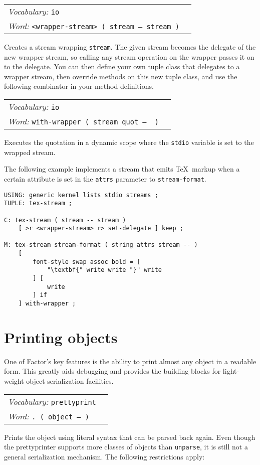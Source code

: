 \documentclass{book}
\newcommand{\vocabulary}[1]{\emph{Vocabulary:} \texttt{#1}&\\}
\newcommand{\ordinaryword}[2]{\index{\texttt{#1}}\emph{Word:} \texttt{#2}&\\}
\newcommand{\wordtable}[1]{


\begin{tabularx}{12cm}{lX}
\hline
#1
\hline
\end{tabularx}

}
\begin{document}
\wordtable{
\vocabulary{io}
\ordinaryword{<wrapper-stream>}{<wrapper-stream>~( stream -- stream~)}
}
Creates a stream wrapping \texttt{stream}. The given stream becomes the delegate of the new wrapper stream, so calling any stream operation on the wrapper passes it on to the delegate.
You can then define your own tuple class that delegates to a wrapper stream, then override methods on this new tuple class, and use the following combinator in your method definitions.

\wordtable{
\vocabulary{io}
\ordinaryword{with-wrapper}{with-wrapper~( stream quot -- ~)}
}
Executes the quotation in a dynamic scope where the \texttt{stdio} variable is set to the wrapped stream.

The following example implements a stream that emits \TeX\ markup when a certain attribute is set in the \texttt{attrs} parameter to \texttt{stream-format}.

\begin{verbatim}
USING: generic kernel lists stdio streams ;
TUPLE: tex-stream ;

C: tex-stream ( stream -- stream )
    [ >r <wrapper-stream> r> set-delegate ] keep ;

M: tex-stream stream-format ( string attrs stream -- )
    [
        font-style swap assoc bold = [
            "\textbf{" write write "}" write
        ] [
            write
        ] if
    ] with-wrapper ;
\end{verbatim}

\section{Printing objects}\label{prettyprint}


One of Factor's key features is the ability to print almost any object in a readable form. This greatly aids debugging and provides the building blocks for light-weight object serialization facilities.

\wordtable{
\vocabulary{prettyprint}
\ordinaryword{.}{.~( object --~)}
}
Prints the object using literal syntax that can be parsed back again. Even though the prettyprinter supports more classes of objects than \texttt{unparse}, it is still not a general serialization mechanism. The following restrictions apply:
\end{document}
